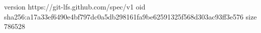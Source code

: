 version https://git-lfs.github.com/spec/v1
oid sha256:a17a33ef6490e4bf797dc0a5db298161fa9be62591325f568d303ac93ff3e576
size 786528
